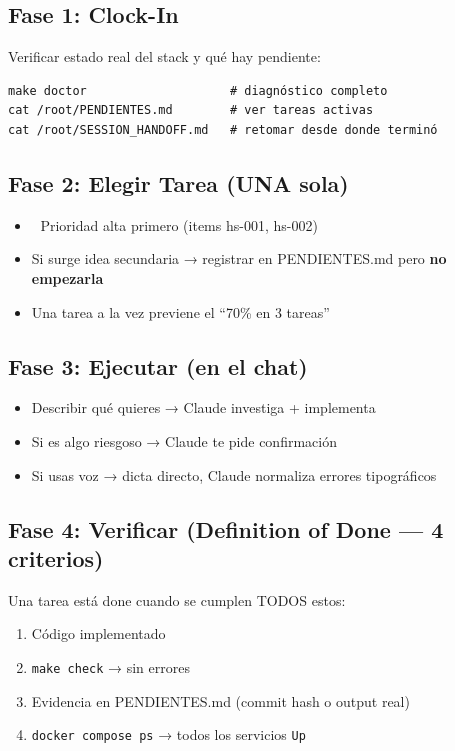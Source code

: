 \documentclass[11pt,a4paper,spanish]{article}
\begin{document}
\vspace{0.4cm}

\subsection*{Fase 1: Clock-In}
Verificar estado real del stack y qué hay pendiente:
\begin{lstlisting}
make doctor                    # diagnóstico completo
cat /root/PENDIENTES.md        # ver tareas activas
cat /root/SESSION_HANDOFF.md   # retomar desde donde terminó
\end{lstlisting}

\subsection*{Fase 2: Elegir Tarea (UNA sola)}
\begin{itemize}
  \item 🔴 Prioridad alta primero (items hs-001, hs-002)
  \item Si surge idea secundaria → registrar en PENDIENTES.md pero \textbf{no empezarla}
  \item Una tarea a la vez previene el ``70\% en 3 tareas''
\end{itemize}

\subsection*{Fase 3: Ejecutar (en el chat)}
\begin{itemize}
  \item Describir qué quieres → Claude investiga + implementa
  \item Si es algo riesgoso → Claude te pide confirmación
  \item Si usas voz → dicta directo, Claude normaliza errores tipográficos
\end{itemize}

\subsection*{Fase 4: Verificar (Definition of Done — 4 criterios)}
Una tarea está done cuando se cumplen TODOS estos:
\begin{enumerate}
  \item \checkmark Código implementado
  \item \checkmark \texttt{make check} → sin errores
  \item \checkmark Evidencia en PENDIENTES.md (commit hash o output real)
  \item \checkmark \texttt{docker compose ps} → todos los servicios \texttt{Up}
\end{enumerate}
\end{document}
